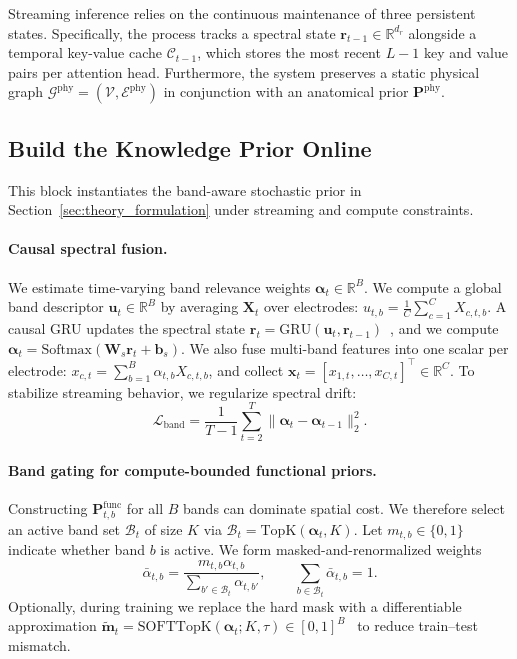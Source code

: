 \documentclass[preprint,12pt]{elsarticle}
\begin{document}
Streaming inference relies on the continuous maintenance of three persistent states. Specifically, the process tracks a spectral state $\mathbf{r}_{t-1}\in\mathbb{R}^{d_r}$ alongside a temporal key-value cache $\mathcal{C}_{t-1}$, which stores the most recent $L-1$ key and value pairs per attention head. Furthermore, the system preserves a static physical graph $\mathcal{G}^{\mathrm{phy}}=(\mathcal{V},\mathcal{E}^{\mathrm{phy}})$ in conjunction with an anatomical prior $\mathbf{P}^{\mathrm{phy}}$.

\subsection{Build the Knowledge Prior Online}
\label{sec:method_prior}

This block instantiates the band-aware stochastic prior in Section~\ref{sec:theory_formulation} under streaming and compute constraints.
\paragraph{Causal spectral fusion.}
We estimate time-varying band relevance weights $\boldsymbol{\alpha}_t\in\mathbb{R}^{B}$.
We compute a global band descriptor $\mathbf{u}_t\in\mathbb{R}^{B}$ by averaging $\mathbf{X}_t$ over electrodes:
$u_{t,b}=\frac{1}{C}\sum_{c=1}^{C}X_{c,t,b}$.
A causal GRU updates the spectral state $\mathbf{r}_t=\mathrm{GRU}(\mathbf{u}_t,\mathbf{r}_{t-1})$~\cite{Cho2014GRU},
and we compute
$\boldsymbol{\alpha}_t=\mathrm{Softmax}(\mathbf{W}_s\mathbf{r}_t+\mathbf{b}_s)$.
We also fuse multi-band features into one scalar per electrode:
$x_{c,t}=\sum_{b=1}^{B}\alpha_{t,b}X_{c,t,b}$,
and collect $\mathbf{x}_t=[x_{1,t},\ldots,x_{C,t}]^\top\in\mathbb{R}^{C}$.
To stabilize streaming behavior, we regularize spectral drift:
\begin{equation}
\mathcal{L}_{\mathrm{band}}
=
\frac{1}{T-1}\sum_{t=2}^{T}\|\boldsymbol{\alpha}_{t}-\boldsymbol{\alpha}_{t-1}\|_2^2.
\label{eq:L_band}
\end{equation}

\paragraph{Band gating for compute-bounded functional priors.}
Constructing $\mathbf{P}^{\mathrm{func}}_{t,b}$ for all $B$ bands can dominate spatial cost.
We therefore select an active band set $\mathcal{B}_t$ of size $K$ via $\mathcal{B}_t=\mathrm{TopK}(\boldsymbol{\alpha}_t,K)$.
Let $m_{t,b}\in\{0,1\}$ indicate whether band $b$ is active.
We form masked-and-renormalized weights
\begin{equation}
\bar{\alpha}_{t,b}
=
\frac{m_{t,b}\alpha_{t,b}}{\sum_{b'\in\mathcal{B}_t}\alpha_{t,b'}},
\qquad
\sum_{b\in\mathcal{B}_t}\bar{\alpha}_{t,b}=1.
\label{eq:masked_weights}
\end{equation}
Optionally, during training we replace the hard mask with a differentiable approximation
$\tilde{\mathbf{m}}_t=\mathrm{SOFTTopK}(\boldsymbol{\alpha}_t;K,\tau)\in[0,1]^B$~\cite{xie2020differentiable}
to reduce train--test mismatch.
\end{document}
